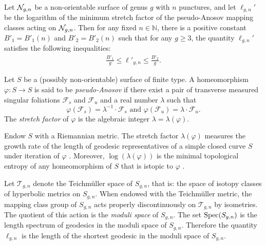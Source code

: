 \begin{thm}\label{thm:stretch1}
  Let $\mathcal{N}_{g,n}$ be a non-orientable surface of genus $g$ with $n$ punctures, and let $\ell_{g,n}'$ be the logarithm of
  the minimum stretch factor of the pseudo-Anosov mapping classes acting on $\mathcal{N}_{g,n}$.
  Then for any fixed $n \in \mathbb{N}$, there is a positive constant $B'_1 = B'_1(n)$ and $B'_2 = B'_2(n)$ such
  that for any $g \geq 3$,
  the quantity $\ell_{g,n}'$ satisfies the following inequalities:
  \begin{align*}
    \frac{B'_1}{g} \leq \ell'_{g,n} \leq \frac{B'_2}{g}.
  \end{align*}
\end{thm}


 Let $S$ be a (possibly non-orientable) surface of finite type.  A homeomorphism $\varphi:S\rightarrow S$ is said to be {\it pseudo-Anosov} if there exist a pair of transverse measured singular foliations $\mathcal{F}_s$ and $\mathcal{F}_u$ and a real number $\lambda$ such that $$\varphi(\mathcal{F}_s)=\lambda^{-1} \cdot \mathcal{F}_s\text{ and } \varphi(\mathcal{F}_u)=\lambda \cdot \mathcal{F}_u.$$  The {\it stretch factor} of $\varphi$ is the algebraic integer $\lambda=\lambda(\varphi)$.

Endow $S$ with a Riemannian metric.  The stretch factor $\lambda(\varphi)$ measures the growth rate of the length of geodesic representatives of a simple closed curve $S$ under iteration of $\varphi$ \cite[Proposition 9.21]{FLP}.  Moreover, $\log(\lambda(\varphi))$ is the minimal topological entropy of any homeomorphism of $S$ that is istopic to $\varphi$ \cite[Expos\'e 10]{FLP}.


Let $\mathcal{T}_{g,n}$ denote the Teichm\"uller space of $S_{g,n}$, that is: the space of isotopy classes of hyperbolic metrics on $S_{g,n}$.
When endowed with the Teichm\"uller metric, the mapping class group of $S_{g,n}$ acts properly discontinuously on $\mathcal{T}_{g,n}$ by isometries.  The quotient of this action is the {\it moduli space} of $S_{g,n}$. The set
$\operatorname{Spec}(S_{g,n})$ is the length spectrum of geodesics in the moduli space of $S_{g,n}$.  Therefore the quantity $\ell_{g,n}$ is the length of the shortest geodesic in the moduli space of $S_{g,n}$.

